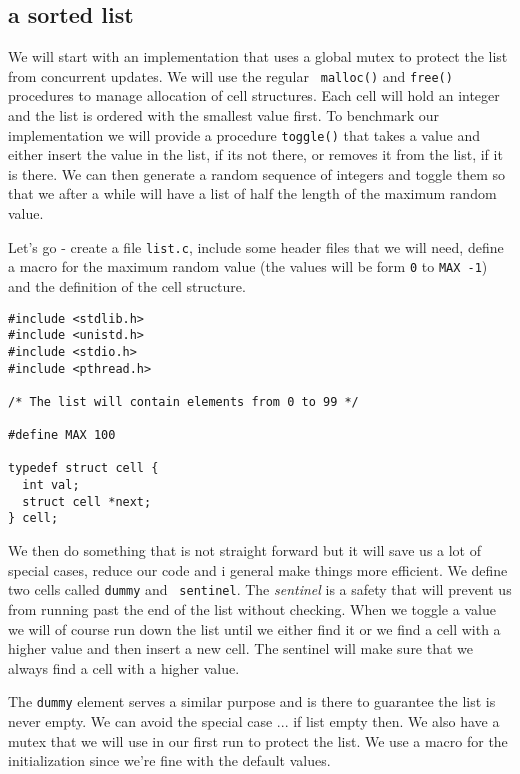 \documentclass[a4paper,11pt]{article}
\begin{document}
\subsection{a sorted list}

We will start with an implementation that uses a global mutex to
protect the list from concurrent updates. We will use the regular {\tt
  malloc()} and {\tt free()} procedures to manage allocation of cell
structures. Each cell will hold an integer and the list is ordered
with the smallest value first. To benchmark our implementation we will
provide a procedure {\tt toggle()} that takes a value and either
insert the value in the list, if its not there, or removes it from the
list, if it is there. We can then generate a random sequence of
integers and toggle them so that we after a while will have a list of
half the length of the maximum random value.

Let's go - create a file {\tt list.c}, include some header files that
we will need, define a macro for the maximum random value (the values
will be form {\tt 0} to {\tt MAX -1}) and the definition of the cell
structure.

\begin{lstlisting}
#include <stdlib.h>
#include <unistd.h>
#include <stdio.h>
#include <pthread.h>

/* The list will contain elements from 0 to 99 */ 

#define MAX 100

typedef struct cell {
  int val;
  struct cell *next;
} cell;
\end{lstlisting}

We then do something that is not straight forward but it will save us
a lot of special cases, reduce our code and i general make things more
efficient. We define two cells called {\tt dummy} and {\tt
  sentinel}. The {\em sentinel} is a safety that will prevent us from
running past the end of the list without checking. When we toggle a
value we will of course run down the list until we either find it or
we find a cell with a higher value and then insert a new cell. The
sentinel will make sure that we always find a cell with a higher value. 

The {\tt dummy} element serves a similar purpose and is there to
guarantee the list is never empty. We can avoid the special case ... if
list empty then. We also have a mutex that we will use in our first
run to protect the list. We use a macro for the initialization since
we're fine with the default values.
\end{document}
